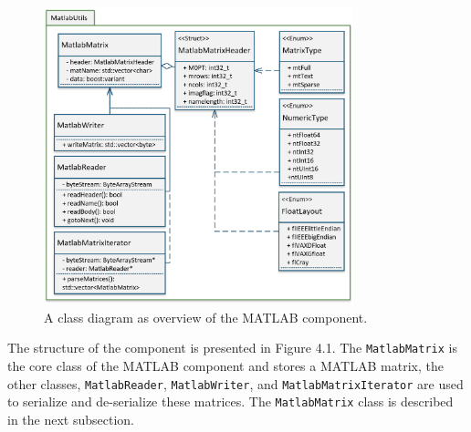 \begin{figure}[ht]
\centering
      \includegraphics[width=0.8\textwidth]{mlab}
        \caption{A class diagram as overview of the MATLAB component.}
\end{figure}

The structure of the component is presented in Figure 4.1. The \texttt{MatlabMatrix} is the core class of the MATLAB component and stores a MATLAB matrix, the other classes, \texttt{MatlabReader}, \texttt{MatlabWriter}, and \texttt{MatlabMatrixIterator} are used to serialize and de-serialize these matrices. The \texttt{MatlabMatrix} class is described in the next subsection.
